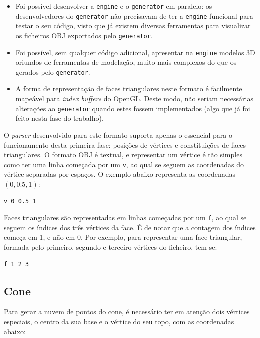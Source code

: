 \documentclass[12pt, a4paper]{article}
\begin{document}
\begin{itemize}
    \item Foi possível desenvolver a \texttt{engine} e o \texttt{generator} em paralelo: os
        desenvolvedores do \texttt{generator} não precisavam de ter a \texttt{engine} funcional para
        testar o seu código, visto que já existem diversas ferramentas para visualizar os ficheiros
        OBJ exportados pelo \texttt{generator}.

    \item Foi possível, sem qualquer código adicional, apresentar na \texttt{engine} modelos 3D
        oriundos de ferramentas de modelação, muito mais complexos do que os gerados pelo
        \texttt{generator}.

    \item A forma de representação de faces triangulares neste formato é facilmente mapeável para
        \emph{index buffers} do OpenGL. Deste modo, não seriam necessárias alterações ao
        \texttt{generator} quando estes fossem implementados (algo que já foi feito nesta fase do
        trabalho).
\end{itemize}

O \emph{parser} desenvolvido para este formato suporta apenas o essencial para o funcionamento desta
primeira fase: posições de vértices e constituições de faces triangulares. O formato OBJ é textual,
e representar um vértice é tão simples como ter uma linha começada por um \texttt{v}, ao qual se
seguem as coordenadas do vértice separadas por espaços. O exemplo abaixo representa as coordenadas
$(0, 0.5, 1)$:

\begin{verbatim}
v 0 0.5 1
\end{verbatim}

Faces triangulares são representadas em linhas começadas por um \texttt{f}, ao qual se seguem os
índices dos três vértices da face. É de notar que a contagem dos índices começa em 1, e não em 0.
Por exemplo, para representar uma face triangular, formada pelo primeiro, segundo e terceiro
vértices do ficheiro, tem-se:

\begin{verbatim}
f 1 2 3
\end{verbatim}

\subsection{Cone}

Para gerar a nuvem de pontos do cone, é necessário ter em atenção dois vértices especiais, o centro
da sua base e o vértice do seu topo, com as coordenadas abaixo:
\end{document}
